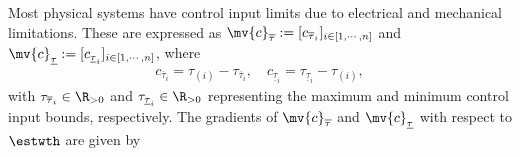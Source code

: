 \documentclass[lettersize,journal]{IEEEtran}
\begin{document}
Most physical systems have control input limits due to electrical and mechanical limitations. These are expressed as $\mv{c}_{\overline \tau}:= [c_{\overline \tau_i}]_{i\in[1,\cdots,n]}$ and $\mv{c}_{\underline\tau}:= [c_{\underline\tau_i}]_{i\in[1,\cdots,n]}$, where
\begin{equation}
    \begin{aligned}
        c_{\overline \tau_i}=\tau_{(i)} - {\tau_{\overline \tau_i}}
        ,
        \quad
        c_{\underline\tau_i}={\tau_{\underline\tau_i}}-\tau_{(i)}
        ,
    \end{aligned}
    \label{eq:cstr:input:bound}
\end{equation}
with $\tau_{\overline \tau_i}\in\R_{>0}$ and $\tau_{\underline\tau_i}\in\R_{>0}$ representing the maximum and minimum control input bounds, respectively.
The gradients of $\mv{c}_{\overline \tau}$ and $\mv{c}_{\underline\tau}$ with respect to $\estwth$ are given by
\end{document}
